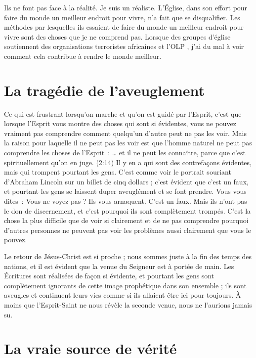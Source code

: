 Ils ne font pas face à la réalité. Je suis un réaliste.
 L'Église, dans son effort pour faire du monde un meilleur endroit
 pour vivre, n'a fait que se disqualifier.
 Les méthodes par lesquelles ils essaient de faire du monde un meilleur
 endroit pour vivre sont des choses que je ne comprend pas. 
 Lorsque des groupes d'église soutiennent des organisations terroristes
 africaines et l'OLP ,
 j'ai du mal à voir comment cela contribue à rendre le monde meilleur.

\section*{La tragédie de l'aveuglement}

Ce qui est frustrant lorsqu'on marche et qu'on est guidé par l'Esprit,
 c'est que lorsque l'Esprit vous montre des choses qui sont si évidentes,
 vous ne pouvez vraiment pas comprendre comment quelqu'un d'autre
 peut ne pas les voir. Mais la raison pour laquelle il ne peut pas les voir
 est que l'homme naturel ne peut pas comprendre les choses de l'Esprit~:
 \og \dots{} et il ne peut les connaître, parce que c'est spirituellement
 qu'on en juge. \fg{} (2:14)
 Il y en a qui sont des contrefaçons évidentes, mais qui trompent pourtant
 les gens. C'est comme voir le portrait souriant d'Abraham Lincoln
 sur un billet de cinq dollars ; c'est évident que c'est un faux,
 et pourtant les gens se laissent duper aveuglément et se font prendre.
 Vous vous dites~: \og Vous ne voyez pas ? Ils vous arnaquent.
 C'est un faux. \fg{}
 Mais ils n'ont pas le don de discernement, et c'est pourquoi ils sont
 complètement trompés.
 C'est la chose la plus difficile que de voir si clairement et de ne pas
 comprendre pourquoi d'autres personnes ne peuvent pas voir les problèmes
 aussi clairement que vous le pouvez.

Le retour de Jésus-Christ est si proche ; nous sommes juste à la fin
 des temps des nations, et il est évident que la venue du Seigneur
 est à portée de main. Les Écritures sont réalisées de façon si évidente,
 et pourtant les gens sont complètement ignorants de cette image prophétique
 dans son ensemble ; ils sont aveugles et continuent leurs vies
 comme si ils allaient être ici pour toujours.
 À moins que l'Esprit-Saint ne nous révèle la seconde venue,
 nous ne l'aurions jamais su.


\section*{La vraie source de vérité}

